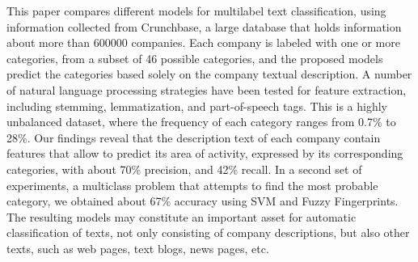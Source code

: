 
This paper compares different models for multilabel text classification, using information collected from Crunchbase, a large data\-base that holds information about more than 600000 companies. Each company is labeled with one or more categories, from a subset of 46 possible categories, and the proposed models predict the categories based solely on the company textual description. A number of natural language processing strategies have been tested for feature extraction, including stemming, lemmatization, and part-of-speech tags. This is a highly unbalanced dataset, where the frequency of each category ranges from 0.7\% to 28\%. Our findings reveal that the description text of each company contain features that allow to predict its area of activity, expressed by its corresponding categories, with about 70\% precision, and 42\% recall. In a second set of experiments, a multiclass problem that attempts to find the most probable category, we obtained about 67\% accuracy using SVM and Fuzzy Fingerprints. The resulting models may constitute an important asset for automatic classification of texts, not only consisting of company descriptions, but also other texts, such as web pages, text blogs, news pages, etc.


